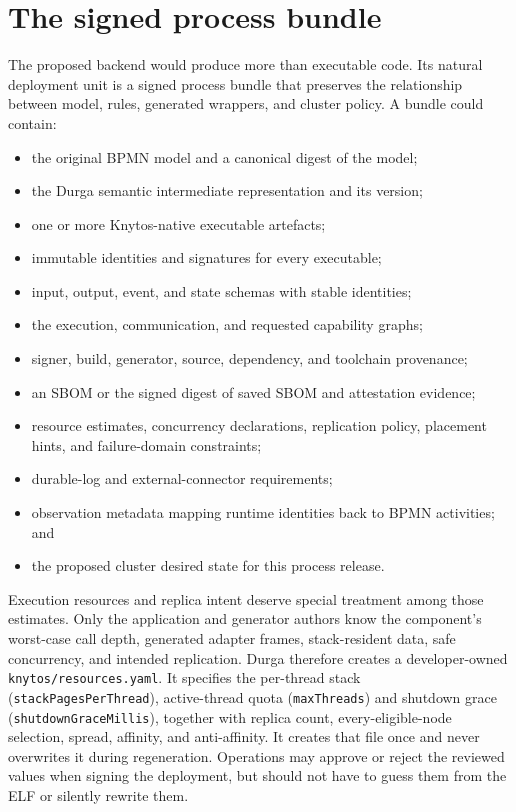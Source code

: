 \section{The signed process bundle}

The proposed backend would produce more than executable code. Its natural
deployment unit is a signed process bundle that preserves the relationship
between model, rules, generated wrappers, and cluster policy. A bundle could
contain:

\begin{itemize}
    \item the original BPMN model and a canonical digest of the model;
    \item the Durga semantic intermediate representation and its version;
    \item one or more Knytos-native executable artefacts;
    \item immutable identities and signatures for every executable;
    \item input, output, event, and state schemas with stable identities;
    \item the execution, communication, and requested capability graphs;
    \item signer, build, generator, source, dependency, and toolchain
        provenance;
    \item an SBOM or the signed digest of saved SBOM and attestation
        evidence;
    \item resource estimates, concurrency declarations, replication policy,
        placement hints, and failure-domain constraints;
    \item durable-log and external-connector requirements;
    \item observation metadata mapping runtime identities back to BPMN
        activities; and
    \item the proposed cluster desired state for this process release.
\end{itemize}

Execution resources and replica intent deserve special treatment among those estimates. Only the application
and generator authors know the component's worst-case call depth, generated
adapter frames, stack-resident data, safe concurrency, and intended replication. Durga therefore
creates a developer-owned \texttt{knytos/resources.yaml}. It specifies the
per-thread stack (\texttt{stackPagesPerThread}), active-thread quota
(\texttt{maxThreads}) and shutdown grace (\texttt{shutdownGraceMillis}), together with replica count,
every-eligible-node selection, spread, affinity, and anti-affinity. It creates that
file once and never overwrites it during regeneration. Operations may approve
or reject the reviewed values when signing the deployment, but should not have
to guess them from the ELF or silently rewrite them.

